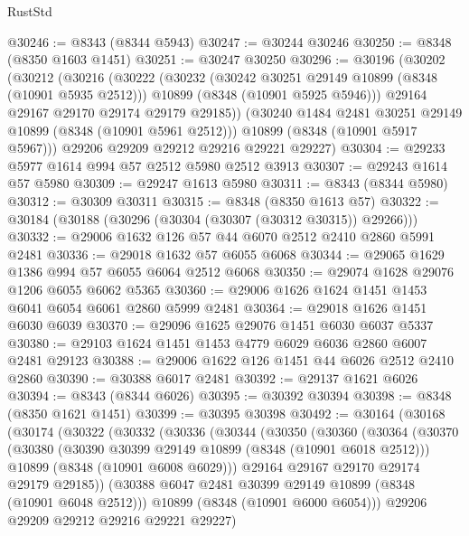 \begin{lexlean}{RustStd}
\begin{coremodule}
@30246 := @8343 (@8344 @5943)
@30247 := @30244 @30246
@30250 := @8348 (@8350 @1603 @1451)
@30251 := @30247 @30250
@30296 := @30196
    (@30202
      (@30212
        (@30216
          (@30222
            (@30232
              (@30242 @30251 @29149 @10899 (@8348 (@10901 @5935 @2512)))
              @10899
              (@8348 (@10901 @5925 @5946)))
            @29164
            @29167
            @29170
            @29174
            @29179
            @29185))
        (@30240 @1484 @2481 @30251 @29149 @10899 (@8348 (@10901 @5961 @2512)))
        @10899
        (@8348 (@10901 @5917 @5967)))
      @29206
      @29209
      @29212
      @29216
      @29221
      @29227)
@30304 := @29233 @5977 @1614 @994 @57 @2512 @5980 @2512 @3913
@30307 := @29243 @1614 @57 @5980
@30309 := @29247 @1613 @5980
@30311 := @8343 (@8344 @5980)
@30312 := @30309 @30311
@30315 := @8348 (@8350 @1613 @57)
@30322 := @30184 (@30188 (@30296 (@30304 (@30307 (@30312 @30315)) @29266)))
@30332 := @29006 @1632 @126 @57 @44 @6070 @2512 @2410 @2860 @5991 @2481
@30336 := @29018 @1632 @57 @6055 @6068
@30344 := @29065 @1629 @1386 @994 @57 @6055 @6064 @2512 @6068
@30350 := @29074 @1628 @29076 @1206 @6055 @6062 @5365
@30360 := @29006 @1626 @1624 @1451 @1453 @6041 @6054 @6061 @2860 @5999 @2481
@30364 := @29018 @1626 @1451 @6030 @6039
@30370 := @29096 @1625 @29076 @1451 @6030 @6037 @5337
@30380 := @29103 @1624 @1451 @1453 @4779 @6029 @6036 @2860 @6007 @2481 @29123
@30388 := @29006 @1622 @126 @1451 @44 @6026 @2512 @2410 @2860
@30390 := @30388 @6017 @2481
@30392 := @29137 @1621 @6026
@30394 := @8343 (@8344 @6026)
@30395 := @30392 @30394
@30398 := @8348 (@8350 @1621 @1451)
@30399 := @30395 @30398
@30492 := @30164
    (@30168
      (@30174
        (@30322
          (@30332
            (@30336
              (@30344
                (@30350
                  (@30360
                    (@30364
                      (@30370
                        (@30380
                          (@30390 @30399 @29149 @10899 (@8348 (@10901 @6018 @2512)))
                          @10899
                          (@8348 (@10901 @6008 @6029)))
                        @29164
                        @29167
                        @29170
                        @29174
                        @29179
                        @29185))
                    (@30388 @6047 @2481 @30399 @29149 @10899 (@8348 (@10901 @6048 @2512)))
                    @10899
                    (@8348 (@10901 @6000 @6054)))
                  @29206
                  @29209
                  @29212
                  @29216
                  @29221
                  @29227)

\end{coremodule}
\end{lexlean}
